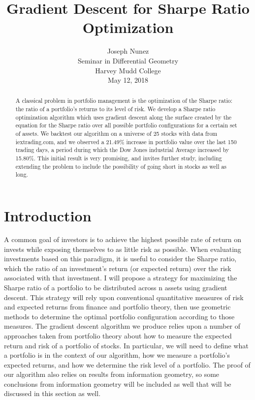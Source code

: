 \documentclass{article}
\title{Gradient Descent for Sharpe Ratio Optimization}
\author{
 Joseph Nunez\\
Seminar in Differential Geometry\\
Harvey Mudd College\\ 
May 12, 2018}
\begin{document}


\maketitle


\begin{abstract}
A classical problem in portfolio management is the optimization of the Sharpe ratio: the ratio of a portfolio’s returns to its level of risk. We develop a Sharpe ratio optimization algorithm which uses gradient descent along the surface created by the equation for the Sharpe ratio over all possible portfolio configurations for a certain set of assets.
We backtest our algorithm on a universe of 25 stocks with data from iextrading.com, and we observed a 21.49\% increase in portfolio value over the last 150 trading days, a period during which the Dow Jones industrial Average increased by 15.80\%. This initial result is very promising, and invites further study, including extending the problem to include the possibility of going short in stocks as well as long.
\end{abstract}




\section{Introduction}
A common goal of investors is to achieve the highest possible rate of return on invests while exposing themselves to as little risk as possible. When evaluating investments based on this paradigm, it is useful to consider the Sharpe ratio, which the ratio of an investment’s return (or expected return) over the risk associated with that investment. I will propose a strategy for maximizing the Sharpe ratio of a portfolio to be distributed across n assets using gradient descent. This strategy will rely upon conventional quantitative measures of risk and expected returns from finance and portfolio theory, then use geometric methods to determine the optimal portfolio configuration according to those measures.
The gradient descent algorithm we produce relies upon a number of approaches taken from portfolio theory about how to measure the expected return and risk of a portfolio of stocks. In particular, we will need to define what a portfolio is in the context of our algorithm, how we measure a portfolio’s expected returns, and how we determine the risk level of a portfolio. The proof of our algorithm also relies on results from information geometry, so some conclusions from information geometry will be included as well that will be discussed in this section as well.
\end{document}
